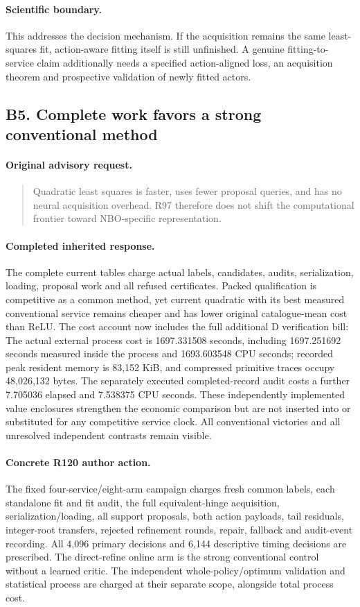 \paragraph{Scientific boundary.}
This addresses the decision mechanism. If the acquisition remains the same least-squares fit, action-aware fitting itself is still unfinished. A genuine fitting-to-service claim additionally needs a specified action-aligned loss, an acquisition theorem and prospective validation of newly fitted actors.

\subsection{B5. Complete work favors a strong conventional method}
\label{response120:B5}
\paragraph{Original advisory request.}
\begin{quote}
Quadratic least squares is faster, uses fewer proposal queries, and has no neural acquisition overhead. R97 therefore does not shift the computational frontier toward NBO-specific representation.
\end{quote}
\paragraph{Completed inherited response.}
The complete current tables charge actual labels, candidates, audits, serialization, loading, proposal work and all refused certificates. Packed qualification is competitive as a common method, yet current quadratic with its best measured conventional service remains cheaper and has lower original catalogue-mean cost than ReLU. The cost account now includes the full additional D verification bill: The actual external process cost is 1697.331508 seconds, including 1697.251692 seconds measured inside the process and 1693.603548 CPU seconds; recorded peak resident memory is 83,152 KiB, and compressed primitive traces occupy 48,026,132 bytes. The separately executed completed-record audit costs a further 7.705036 elapsed and 7.538375 CPU seconds. These independently implemented value enclosures strengthen the economic comparison but are not inserted into or substituted for any competitive service clock. All conventional victories and all unresolved independent contrasts remain visible.
\paragraph{Concrete R120 author action.}
The fixed four-service/eight-arm campaign charges fresh common labels, each standalone fit and fit audit, the full equivalent-hinge acquisition, serialization/loading, all support proposals, both action payloads, tail residuals, integer-root transfers, rejected refinement rounds, repair, fallback and audit-event recording. All 4,096 primary decisions and 6,144 descriptive timing decisions are prescribed. The direct-refine online arm is the strong conventional control without a learned critic. The independent whole-policy/optimum validation and statistical process are charged at their separate scope, alongside total process cost.
